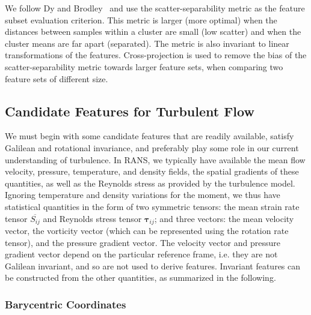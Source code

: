 We follow Dy and Brodley~\cite{mclachlan2004finite} and use the scatter-separability metric as the feature subset evaluation criterion. This metric is larger (more optimal) when the distances between samples within a cluster are small (low scatter) and when the cluster means are far apart (separated). The metric is also invariant to linear transformations of the features. Cross-projection is used to remove the bias of the scatter-separability metric towards larger feature sets, when comparing two feature sets of different size.

\subsection{Candidate Features for Turbulent Flow}
\label{subsec:candidate_features}

We must begin with some candidate features that are readily available, satisfy Galilean and rotational
invariance, and preferably play some role in our current understanding of turbulence. In RANS, we
typically have available the mean ﬂow velocity, pressure, temperature, and density ﬁelds, the spatial
gradients of these quantities, as well as the Reynolds stress as provided by the turbulence model. Ignoring temperature and density variations for the moment, we thus have statistical quantities in the form of two symmetric tensors: the mean strain rate tensor $\overline{S_{ij}}$ and Reynolds stress tensor $\boldsymbol{\tau}_{ij}$; and three vectors: the mean velocity vector, the vorticity vector (which can be represented using the rotation rate tensor), and the pressure gradient vector. The velocity vector and pressure gradient vector depend on the particular reference frame, i.e. they are not Galilean invariant, and so are not used to derive features. Invariant features can be constructed from the other quantities, as summarized in the following.

\subsubsection{Barycentric Coordinates}

